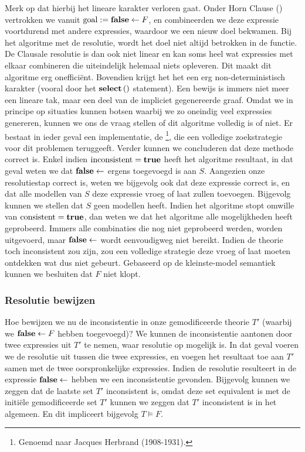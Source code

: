 Merk op dat hierbij het lineare karakter verloren gaat. Onder Horn Clause () vertrokken we vanuit $\mbox{goal}:=\mbox{\bf false}\leftarrow F$, en combineerden we deze expressie voortdurend met andere expressies, waardoor we een nieuw doel bekwamen. Bij het algoritme met de resolutie, wordt het doel niet altijd betrokken in de functie. De Clausale resolutie is dan ook niet linear en kan soms heel wat expressies met elkaar combineren die uiteindelijk helemaal niets opleveren. Dit maakt dit algoritme erg onefficiënt. Bovendien krijgt het het een erg non-deterministisch karakter (vooral door het $\mbox{\bf select}\left(  \right)$ statement). Een bewijs is immers niet meer een lineare tak, maar een deel van de impliciet gegenereerde graaf. Omdat we in principe op situaties kunnen botsen waarbij we zo oneindig veel expressies genereren, kunnen we ons de vraag stellen of dit algoritme volledig is of niet. Er bestaat in ieder geval een implementatie, de \footnote{Genoemd naar Jacques Herbrand (1908-1931).}, die een volledige zoekstrategie voor dit problemen teruggeeft.
Verder kunnen we concluderen dat deze methode correct is. Enkel indien $\mbox{inconsistent}=\mbox{\bf true}$ heeft het algoritme resultaat, in dat geval weten we dat $\mbox{\bf false}\leftarrow$ ergens toegevoegd is aan $S$. Aangezien onze resolutiestap correct is, weten we bijgevolg ook dat deze expressie correct is, en dat alle modellen van $S$ deze expressie vroeg of laat zullen toevoegen. Bijgevolg kunnen we stellen dat $S$ geen modellen heeft. Indien het algoritme stopt omwille van $\mbox{consistent}=\mbox{\bf true}$, dan weten we dat het algoritme alle mogelijkheden heeft geprobeerd. Immers alle combinaties die nog niet geprobeerd werden, worden uitgevoerd, maar $\mbox{\bf false}\leftarrow$ wordt eenvoudigweg niet bereikt. Indien de theorie toch inconsistent zou zijn, zou een volledige strategie deze vroeg of laat moeten ontdekken wat dus niet gebeurt. Gebaseerd op de kleinste-model semantiek kunnen we besluiten dat $F$ niet klopt.
\subsubsection{Resolutie bewijzen}
\label{sss:resolutionProof}
Hoe bewijzen we nu de inconsistentie in onze gemodificeerde theorie $T'$ (waarbij we $\mbox{\bf false}\leftarrow F$ hebben toegevoegd)? We kunnen de inconsistentie aantonen door twee expressies uit $T'$ te nemen, waar resolutie op mogelijk is. In dat geval voeren we de resolutie uit tussen die twee expressies, en voegen het resultaat toe aan $T'$ samen met de twee oorspronkelijke expressies. Indien de resolutie resulteert in de expressie $\mbox{\bf false}\leftarrow$ hebben we een inconsistentie gevonden. Bijgevolg kunnen we zeggen dat de laatste set $T'$ inconsistent is, omdat deze set equivalent is met de initiële gemodificeerde set $T'$ kunnen we zeggen dat $T'$ inconsistent is in het algemeen. En dit impliceert bijgevolg $T\vDash F$.
